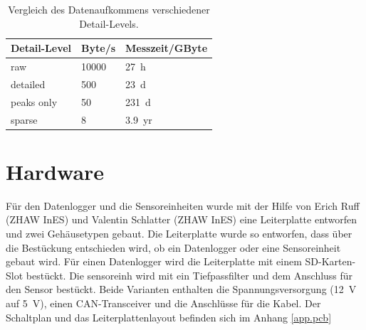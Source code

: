 \begin{table}
\begin{tabular}{|l|l|l|}
\hline \textbf{Detail-Level} & \textbf{Byte/s} & Messzeit/GByte\\ 
\hline raw                   & 10000 & 27~h \\
\hline detailed              &   500 & 23~d \\
\hline peaks only            &    50 & 231~d \\
\hline sparse                &     8 & 3.9~yr \\
\hline 
\end{tabular}
\caption{Vergleich des Datenaufkommens verschiedener Detail-Levels.}
\label{table.datarate}
\end{table} 

\section{Hardware}
Für den Datenlogger und die Sensoreinheiten wurde mit der Hilfe von Erich Ruff (ZHAW InES) und Valentin Schlatter (ZHAW InES) eine Leiterplatte entworfen und zwei Gehäusetypen gebaut. Die Leiterplatte wurde so entworfen, dass über die Bestückung entschieden wird, ob ein Datenlogger oder eine Sensoreinheit gebaut wird. Für einen Datenlogger wird die Leiterplatte mit einem SD-Karten-Slot bestückt. Die \gls{sensoreinh} wird mit ein Tiefpassfilter und dem Anschluss für den Sensor bestückt. Beide Varianten enthalten die Spannungsversorgung (12~V auf 5~V), einen CAN-Transceiver und die Anschlüsse für die Kabel. Der Schaltplan und das Leiterplattenlayout befinden sich im Anhang \ref{app.pcb}